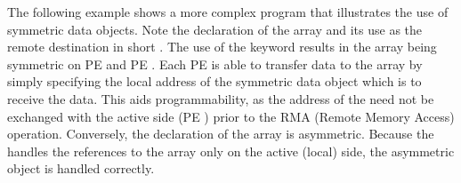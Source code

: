 The following example shows a more complex \openshmem program that illustrates the use of symmetric data objects.  Note the declaration of the   array and its use as the remote destination in \openshmem short \PUT.  The use of the  keyword results in the  array being symmetric on \ac{PE}  and \ac{PE} .  Each \ac{PE} is able to transfer data to the \target{} array by simply specifying the local address of the symmetric data object which is to receive the data.  This aids programmability, as the address of the \target{} need not be exchanged with the active side (\ac{PE} ) prior to the RMA (Remote Memory Access) operation.  Conversely, the declaration of the  array is asymmetric.  Because the \PUT{} handles the references to the  array only on the active (local) side, the asymmetric \source{} object is handled correctly.

\begin{minipage}{\linewidth}
\vspace{0.1in}
\vspace{0.1in}
\end{minipage}
